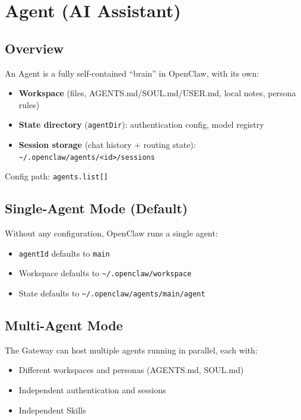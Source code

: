 \chapter{Agent (AI Assistant)}

\section{Overview}

An Agent is a fully self-contained ``brain'' in OpenClaw, with its own:

\begin{itemize}
  \item \textbf{Workspace} (files, AGENTS.md/SOUL.md/USER.md, local notes, persona rules)
  \item \textbf{State directory} (\texttt{agentDir}): authentication config, model registry
  \item \textbf{Session storage} (chat history + routing state): \texttt{\textasciitilde{}/.openclaw/agents/<id>/sessions}
\end{itemize}

Config path: \texttt{agents.list[]}

\section{Single-Agent Mode (Default)}

Without any configuration, OpenClaw runs a single agent:

\begin{itemize}
  \item \texttt{agentId} defaults to \texttt{main}
  \item Workspace defaults to \texttt{\textasciitilde{}/.openclaw/workspace}
  \item State defaults to \texttt{\textasciitilde{}/.openclaw/agents/main/agent}
\end{itemize}

\section{Multi-Agent Mode}

The Gateway can host multiple agents running in parallel, each with:

\begin{itemize}
  \item Different workspaces and personas (AGENTS.md, SOUL.md)
  \item Independent authentication and sessions
  \item Independent Skills
\end{itemize}

